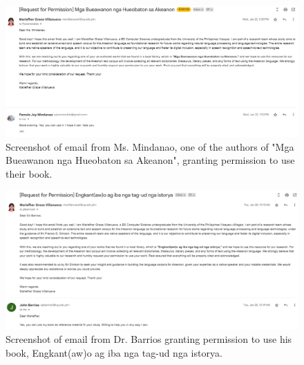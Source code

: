 \begin{figure}[h!]
    \centering
    \includegraphics[width=\textwidth]{./appendix/mindanao-permission.png}
    \caption{Screenshot of email from Ms. Mindanao, one of the authors of "Mga Bueawanon nga Hueobaton sa Akeanon", granting permission to use their book.}
    \label{fig:bible}
\end{figure}

\begin{figure}[h!]
    \centering
    \includegraphics[width=\textwidth]{./appendix/barrios-permission.png}
    \caption{Screenshot of email from Dr. Barrios granting permission to use his book, Engkant(aw)o ag iba nga tag-ud nga istorya.}
    \label{fig:bible}
\end{figure}

